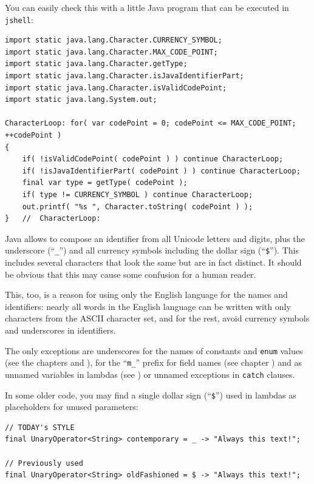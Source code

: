 You can easily check this with a little Java program that can be executed in \verb#jshell#:
\begin{lstlisting}
import static java.lang.Character.CURRENCY_SYMBOL;
import static java.lang.Character.MAX_CODE_POINT;
import static java.lang.Character.getType;
import static java.lang.Character.isJavaIdentifierPart;
import static java.lang.Character.isValidCodePoint;
import static java.lang.System.out;

CharacterLoop: for( var codePoint = 0; codePoint <= MAX_CODE_POINT; ++codePoint )
{
    if( !isValidCodePoint( codePoint ) ) continue CharacterLoop;
    if( !isJavaIdentifierPart( codePoint ) ) continue CharacterLoop;
    final var type = getType( codePoint );
    if( type != CURRENCY_SYMBOL ) continue CharacterLoop;
    out.printf( "%s ", Character.toString( codePoint ) );
}   //  CharacterLoop:
\end{lstlisting}

Java allows to compose an identifier from all Unicode letters and digits, plus the underscore (``\verb#_#'') and all currency symbols including the dollar sign (``\verb#$#''). This includes several characters that look the same but are in fact distinct. It should be obvious that this may cause some confusion for a human reader.

This, too, is a reason for using only the English language for the names and identifiers: nearly all words in the English language can be written with only characters from the ASCII character set, and for the rest, avoid currency symbols and underscores in identifiers. 

The only exceptions are underscores for the names of constants and \lstinline|enum| values (see the chapters  and ), for the “\verb#m_#” prefix for field names (see chapter ) and as unnamed variables in lambdas (see ) or unnamed exceptions in \lstinline|catch| clauses. 

In some older code, you may find a single dollar sign (``\verb#$#'') used in lambdas as placeholders for unused parameters:
\begin{lstlisting}
// TODAY's STYLE
final UnaryOperator<String> contemporary = _ -> "Always this text!";

// Previously used
final UnaryOperator<String> oldFashioned = $ -> "Always this text!";
\end{lstlisting}

